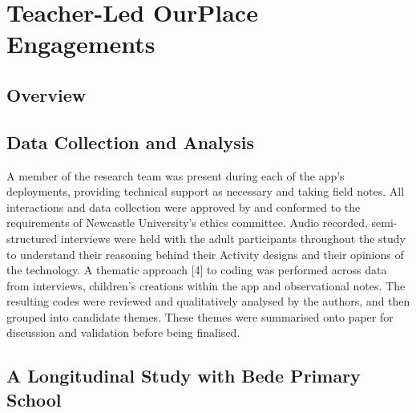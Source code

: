 \chapter{Teacher-Led OurPlace Engagements}

\section{Overview}

\section{Data Collection and Analysis}

A member of the research team was present during each of the app’s deployments, providing technical support as necessary and taking field notes. All interactions and data collection were approved by and conformed to the requirements of Newcastle University’s ethics committee. Audio recorded, semi-structured interviews were held with the adult participants throughout the study to understand their reasoning behind their Activity designs and their opinions of the technology. A thematic approach [4] to coding was performed across data from interviews, children’s creations within the app and observational notes. The resulting codes were reviewed and qualitatively analysed by the authors, and then grouped into candidate themes. These themes were summarised onto paper for discussion and validation before being finalised.

\section{A Longitudinal Study with Bede Primary School}

